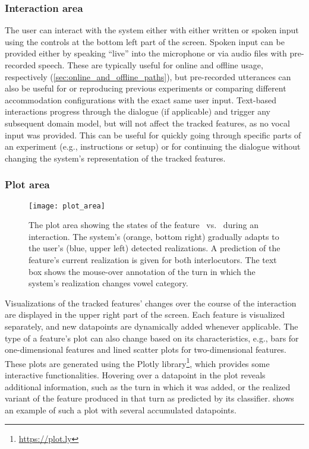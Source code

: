 \subsubsection{Interaction area}
\label{subsubsec:interaction_area}

The user can interact with the system either with either written or spoken input using the controls at the bottom left part of the screen.
Spoken input can be provided either by speaking \enquote{live} into the microphone or via audio files with pre-recorded speech.
These are typically useful for online and offline usage, respectively (\cref{sec:online_and_offline_paths}), but pre-recorded utterances can also be useful for or reproducing previous experiments or comparing different accommodation configurations with the exact same user input.
Text-based interactions progress through the dialogue (if applicable) and trigger any subsequent domain model, but will not affect the tracked features, as no vocal input was provided.
This can be useful for quickly going through specific parts of an experiment (e.g., instructions or setup) or for continuing the dialogue without changing the system's representation of the tracked features.

\subsubsection{Plot area}
\label{subsubsec:plot_area}

\begin{figure}[t]
	\centering
	\texttt{[image: plot\_area]}
	\caption[Real-time dynamic visualization of phonetic changes]
		{The plot area showing the states of the feature \textipa{[E:]}~vs.~\textipa{[e:]} during an interaction.
		The system's (orange, bottom right) gradually adapts to the user's (blue, upper left) detected realizations.
		A prediction of the feature's current realization is given for both interlocutors.
		The text box shows the mouse-over annotation of the turn in which the system's realization changes vowel category.}
	\label{fig:plot}
\end{figure}

Visualizations of the tracked features' changes over the course of the interaction are displayed in the upper right part of the screen.
Each feature is visualized separately, and new datapoints are dynamically added whenever applicable.
The type of a feature's plot can also change based on its characteristics, e.g., bars for one-dimensional features and lined scatter plots for two-dimensional features.
These plots are generated using the Plotly library\footnote{\url{https://plot.ly}}, which provides some interactive functionalities.
Hovering over a datapoint in the plot reveals additional information, such as the turn in which it was added, or the realized variant of the feature produced in that turn as predicted by its classifier.
 shows an example of such a plot with several accumulated datapoints.

